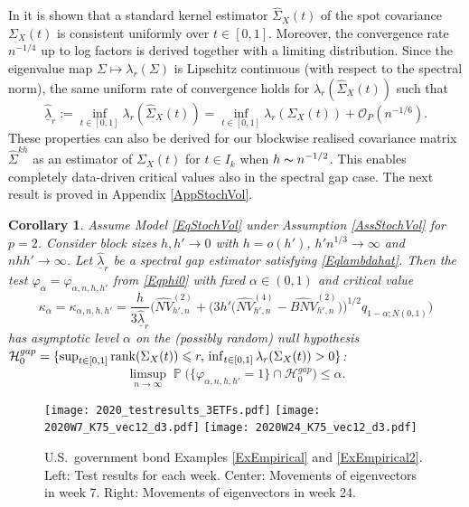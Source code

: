 \documentclass[preprint,aos]{imsart}
\numberwithin{equation}{section}
\newtheorem{corollary}[satz]{Corollary}
\theoremstyle{remark}
\DeclareMathOperator{\PP}{{\mathbb P}}
\renewcommand{\phi}{\varphi}
\renewcommand{\le}{\leqslant}
\begin{document}
In \citet[Theorem 2]{FanWang2008} it is shown that a standard kernel estimator $\hat\Sigma_X(t)$ of the spot covariance $\Sigma_X(t)$ is consistent uniformly over $t\in[0,1]$. Moreover, the convergence rate $n^{-1/4}$ up to log factors is derived together with a limiting distribution. Since the eigenvalue map $\Sigma\mapsto \lambda_r(\Sigma)$ is Lipschitz continuous (with respect to the spectral norm), the same uniform rate of convergence holds for $\lambda_r(\hat\Sigma_X(t))$ such that
\begin{equation}\label{Eqlambdahat}
\hat{\underline\lambda}_r:=\inf_{t\in[0,1]}\lambda_r(\hat\Sigma_X(t))=\inf_{t\in[0,1]}\lambda_r(\Sigma_X(t))+{\mathcal O}_P(n^{-1/6}).
\end{equation}
These properties can also be derived for our blockwise realised covariance matrix $\hat\Sigma^{kh}$ as an estimator of $\Sigma_X(t)$ for $t\in I_k$ when $h\thicksim n^{-1/2}$.
This enables completely data-driven critical values also in the spectral gap case. The next result is proved in Appendix \ref{AppStochVol}.

\begin{corollary}\label{Corkappahat2}
Assume Model \eqref{EqStochVol} under Assumption \ref{AssStochVol} for $p=2$. Consider block sizes $h,h'\to 0$ with $h=o(h')$, $h'n^{1/3}\to\infty$ and $nhh'\to\infty$. Let $\hat{\underline\lambda}_r$ be a spectral gap estimator satisfying \eqref{Eqlambdahat}.
Then the test $\phi_\alpha=\phi_{\alpha,n,h,h'}$ from \eqref{Eqphi0} with fixed $\alpha\in(0,1)$ and critical value
\[ \kappa_\alpha=\kappa_{\alpha,n,h,h'}=\frac {h}{3\hat{\underline\lambda}_r}\Big(\widehat{NV}_{h',n}^{(2)}+ \Big(3h'\big(\widehat{NV}_{h',n}^{(4)}-\widehat{BNV}_{h',n}^{(2)}\big)\Big)^{1/2}q_{1-\alpha;N(0,1)}\Big)\]
has asymptotic level $\alpha$ on the (possibly random) null hypothesis ${\mathcal H}_0^{gap}=\{\sup_{t\in[0,1]}\rank(\Sigma_X(t))\le r,\,\inf_{t\in[0,1]}\lambda_r(\Sigma_X(t))>0\}$:
\[ \limsup_{n\to\infty}\PP\Big(\{\phi_{\alpha,n,h,h'}=1\}\cap{\mathcal H}_0^{gap}\Big)\le\alpha.\]
\end{corollary}


\begin{figure}[t]
\centering
\texttt{[image: 2020\_testresults\_3ETFs.pdf]}
 \texttt{[image: 2020W7\_K75\_vec12\_d3.pdf]}
\texttt{[image: 2020W24\_K75\_vec12\_d3.pdf]}
 \caption{U.S.\ government bond Examples \ref{ExEmpirical} and \ref{ExEmpirical2}. Left: Test results for each week. Center: Movements of eigenvectors in week 7. Right: Movements of eigenvectors in week 24.}\label{FigBondData}
\end{figure}
\end{document}
